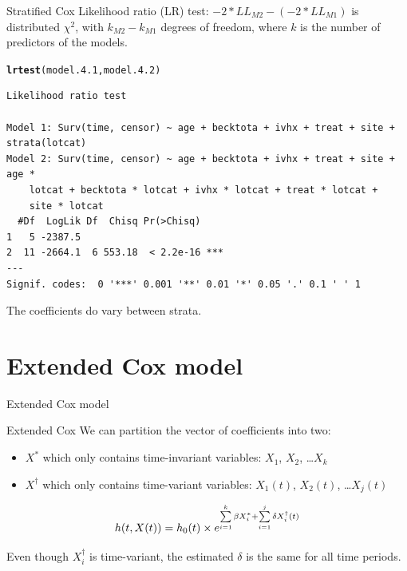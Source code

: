 \documentclass[12pt,english,pdf,xcolor=dvipsnames,aspectratio=169,handout]{beamer}\usepackage[]{graphicx}\usepackage[]{xcolor}
\makeatletter
\newcommand{\hlstd}[1]{\textcolor[rgb]{0.345,0.345,0.345}{#1}}%
\newcommand{\hlkwd}[1]{\textcolor[rgb]{0.737,0.353,0.396}{\textbf{#1}}}%
\newenvironment{kframe}{%
 \def\at@end@of@kframe{}%
 \ifinner\ifhmode%
  \def\at@end@of@kframe{\end{minipage}}%
  \begin{minipage}{\columnwidth}%
 \fi\fi%
 \def\FrameCommand##1{\hskip\@totalleftmargin \hskip-\fboxsep
 \colorbox{shadecolor}{##1}\hskip-\fboxsep
     \hskip-\linewidth \hskip-\@totalleftmargin \hskip\columnwidth}%
 \MakeFramed {\advance\hsize-\width
   \@totalleftmargin\z@ \linewidth\hsize
   \@setminipage}}%
 {\par\unskip\endMakeFramed%
 \at@end@of@kframe}
\newenvironment{knitrout}{}{} %
\makeatother
\begin{document}
\begin{frame}[fragile]{Stratified Cox}
Likelihood ratio (LR) test: $-2*LL_{M2} - (-2*LL_{M1})$ is distributed $\chi^2$, with $k_{M2} - k_{M1}$ degrees of freedom, where $k$ is the number of predictors of the models.\bigskip

\begin{knitrout}\scriptsize
{}\color{fgcolor}\begin{kframe}
\begin{alltt}
\hlkwd{lrtest}\hlstd{(model.4.1, model.4.2)}
\end{alltt}
\begin{verbatim}
Likelihood ratio test

Model 1: Surv(time, censor) ~ age + becktota + ivhx + treat + site + strata(lotcat)
Model 2: Surv(time, censor) ~ age + becktota + ivhx + treat + site + age * 
    lotcat + becktota * lotcat + ivhx * lotcat + treat * lotcat + 
    site * lotcat
  #Df  LogLik Df  Chisq Pr(>Chisq)    
1   5 -2387.5                         
2  11 -2664.1  6 553.18  < 2.2e-16 ***
---
Signif. codes:  0 '***' 0.001 '**' 0.01 '*' 0.05 '.' 0.1 ' ' 1
\end{verbatim}
\end{kframe}
\end{knitrout}

The coefficients do vary between strata.
\end{frame}



\section{Extended Cox model}


\begin{frame}

\begin{center}
\huge Extended Cox model
\end{center}
\end{frame}


\begin{frame}{Extended Cox}
We can partition the vector of coefficients into two:

\begin{itemize}
\item $X^{*}$ which only contains time-invariant variables: $X_1$, $X_2$, \dots $X_k$
\item $X^{\dagger}$ which only contains time-variant variables: $X_1(t)$, $X_2(t)$, \dots $X_j(t)$
\end{itemize}

\begin{equation}
\centering
h(t, X(t)) = h_0(t) \times e^{\sum\limits_{i=1}^{k} \beta X_i^{*} + \sum\limits_{i=1}^{j} \delta X_i^{\dagger}(t)}
\end{equation}

Even though $X_i^{\dagger}$ is time-variant, the estimated $\delta$ is the same for all time periods.
\end{frame}
\end{document}
